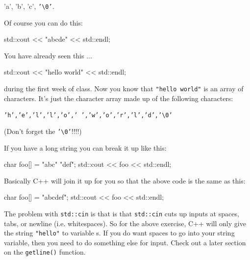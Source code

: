 \begin{center}
'a', 'b', 'c', \texttt{'\textbackslash 0'}.
\end{center}




Of course you can do this:

\begin{consolethree}[escapeinside=||]
std::cout << "abc\0de" << std::endl;
\end{consolethree}

You have already seen this ...

\begin{consolethree}[escapeinside=||]
std::cout << "hello world" << std::endl;
\end{consolethree}

during the first week of class. Now you know that \texttt{"hello world"} is an array of characters. It's just the character array made up of the following characters:

\begin{center}
\texttt{'h','e','l','l','o',' ','w','o','r','l','d','\textbackslash 0'}
\end{center}

(Don't forget the \texttt{'\textbackslash 0'}!!!!)


If you have a long string you can break it up like this:

\begin{consolethree}[escapeinside=||]
char foo[] = "abc"
             "def";
std::cout << foo << std::endl;
\end{consolethree}

Basically C++ will join it up for you so that the above code is the same as this:

\begin{consolethree}[escapeinside=||]
char foo[] = "abcdef";
std::cout << foo << std::endl;
\end{consolethree}




The problem with \texttt{std::cin} is that is that \texttt{std::cin} cuts up inputs at spaces, tabs, or newline (i.e. whitespaces). So for the above exercise, C++ will only give the string \texttt{"hello"} to variable s. If you do want spaces to go into your string variable, then you need to do something else for input. Check out a later section on the \texttt{getline()} function.


